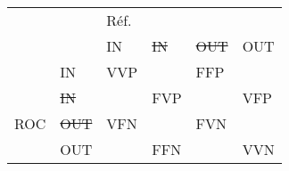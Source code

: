 \begin{tabular}{|ll|llll|}
\hline
\multicolumn{2}{|l|}{}                                            & \multicolumn{4}{l|}{Réf.}                              \\ 
\cline{3-6} 
\multicolumn{2}{|l|}{\multirow{-2}{*}{}}                    & \multicolumn{1}{l|}{IN}
    & \multicolumn{1}{l|}{\sout{IN}}          
    & \multicolumn{1}{l|}{\sout{OUT}}   
    & \multicolumn{1}{l|}{OUT}      \\ 
\hline
\multicolumn{1}{|l|}{}                      
    & IN                         
    & \multicolumn{1}{l|}{VVP}
    & \multicolumn{1}{l|}{\cellcolor[HTML]{000000}} 
    & FFP   
    & \multicolumn{1}{l|}{\cellcolor[HTML]{000000}}\\ 
\cline{2-6} 
\multicolumn{1}{|l|}{}                      
    & \sout{IN}             
    & \multicolumn{1}{l|}{\cellcolor[HTML]{000000}}  
    & \multicolumn{1}{l|}{FVP}                      
    & \cellcolor[HTML]{000000} 
    & \multicolumn{1}{l|}{VFP}\\ 
\cline{2-6}
\multicolumn{1}{|l|}{\multirow{-4}{*}{ROC}} 
    & \sout{OUT}           
    & \multicolumn{1}{l|}{VFN} 
    & \multicolumn{1}{l|}{\cellcolor[HTML]{000000}} 
    & FVN  
    & \multicolumn{1}{l|}{\cellcolor[HTML]{000000}}                    \\ 
\cline{2-6} 
\multicolumn{1}{|l|}{}                      & {\color[HTML]{000000} OUT} 
    & \multicolumn{1}{l|}{\cellcolor[HTML]{000000}}
    & \multicolumn{1}{l|}{FFN} 
    & \cellcolor[HTML]{000000} 
    & \multicolumn{1}{l|}{VVN}\\
\hline
\end{tabular}